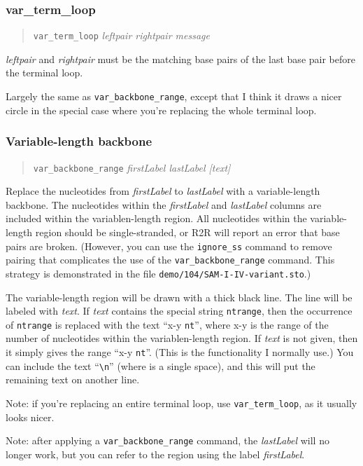 \documentclass[letterpaper,12pt]{report}
\newcommand{\example}[1]{
\begin{quote}
{\raggedright
#1
}
\end{quote}
}
\begin{document}
\subsubsection{var\_term\_loop}
\example{{\tt var\_term\_loop}   \textit{leftpair  rightpair  message}}

\textit{leftpair } and \textit{rightpair }must be the matching base
pairs of the last base pair before the terminal loop.

Largely the same as {\tt var\_backbone\_range}, except that I think it draws a
nicer circle in the special case where you{\textquoteright}re replacing the whole terminal
loop.


\subsubsection{Variable-length backbone}
\example{{\tt var\_backbone\_range}  \textit{firstLabel  lastLabel [text]}}

Replace the nucleotides from \textit{firstLabel} to \textit{lastLabel}
 with a variable-length
backbone.  
The nucleotides within the {\it firstLabel} and {\it lastLabel}
columns are included within the variablen-length region.
All nucleotides within the variable-length region should be
single-stranded, or R2R will report an error that base pairs
are broken.
(However, you can use the {\tt ignore\_ss} command to remove pairing
that complicates the use of the {\tt var\_backbone\_range} command.
This strategy is demonstrated in the file {\tt demo/104/SAM-I-IV-variant.sto}.)

The variable-length region will be drawn with a thick black line.
The line will be labeled with
\textit{text}.  If \textit{text} contains the special string {\tt ntrange},
then the occurrence of {\tt ntrange} is replaced with the text {\textquotedblleft}x-y
{\tt nt}{\textquotedblright}, where x-y is the range of the number of nucleotides
within the variablen-length region.  If \textit{text} is not
given, then it simply gives the range ``x-y {\tt nt}''.  (This is the functionality
I normally use.)
You can include the text ``{\tt \textvisiblespace{}\textbackslash{}n\textvisiblespace{}}'' (where {\tt \textvisiblespace{}} is a single space), and this will put the remaining text on another line.

Note: if you{\textquoteright}re replacing an entire terminal loop, use
{\tt var\_term\_loop}, as it usually looks nicer.

Note: after applying a {\tt var\_backbone\_range} command, the {\it lastLabel}
will no longer work, but you can refer to the region using
the label {\it firstLabel}.
\end{document}
